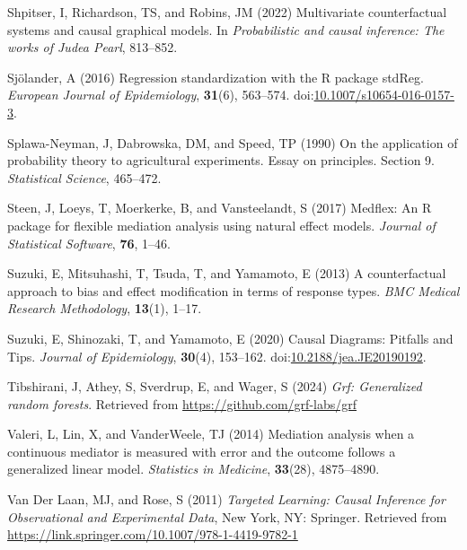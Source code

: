 \documentclass[
  single column]{article}
\newlength{\cslhangindent}
\newenvironment{CSLReferences}[2] %
 {\begin{list}{}{%
  \setlength{\itemindent}{0pt}
  \setlength{\leftmargin}{0pt}
  \setlength{\parsep}{0pt}
  \ifodd #1
   \setlength{\leftmargin}{\cslhangindent}
   \setlength{\itemindent}{-1\cslhangindent}
  \fi
  \setlength{\itemsep}{#2\baselineskip}}}
 {\end{list}}
\begin{document}
\begin{CSLReferences}{1}{0}
Shpitser, I, Richardson, TS, and Robins, JM (2022) Multivariate
counterfactual systems and causal graphical models. In
\emph{Probabilistic and causal inference: The works of {J}udea {P}earl},
813--852.

Sjölander, A (2016) Regression standardization with the R package
stdReg. \emph{European Journal of Epidemiology}, \textbf{31}(6),
563--574.
doi:\href{https://doi.org/10.1007/s10654-016-0157-3}{10.1007/s10654-016-0157-3}.

Splawa-Neyman, J, Dabrowska, DM, and Speed, TP (1990) On the application
of probability theory to agricultural experiments. Essay on principles.
Section 9. \emph{Statistical Science}, 465--472.

Steen, J, Loeys, T, Moerkerke, B, and Vansteelandt, S (2017) Medflex: An
{R} package for flexible mediation analysis using natural effect models.
\emph{Journal of Statistical Software}, \textbf{76}, 1--46.

Suzuki, E, Mitsuhashi, T, Tsuda, T, and Yamamoto, E (2013) A
counterfactual approach to bias and effect modification in terms of
response types. \emph{BMC Medical Research Methodology}, \textbf{13}(1),
1--17.

Suzuki, E, Shinozaki, T, and Yamamoto, E (2020) Causal Diagrams:
Pitfalls and Tips. \emph{Journal of Epidemiology}, \textbf{30}(4),
153--162.
doi:\href{https://doi.org/10.2188/jea.JE20190192}{10.2188/jea.JE20190192}.

Tibshirani, J, Athey, S, Sverdrup, E, and Wager, S (2024) \emph{Grf:
Generalized random forests}. Retrieved from
\url{https://github.com/grf-labs/grf}

Valeri, L, Lin, X, and VanderWeele, TJ (2014) Mediation analysis when a
continuous mediator is measured with error and the outcome follows a
generalized linear model. \emph{Statistics in Medicine},
\textbf{33}(28), 4875--4890.

Van Der Laan, MJ, and Rose, S (2011) \emph{Targeted Learning: Causal
Inference for Observational and Experimental Data}, New York, NY:
Springer. Retrieved from
\url{https://link.springer.com/10.1007/978-1-4419-9782-1}


\end{CSLReferences}
\end{document}
